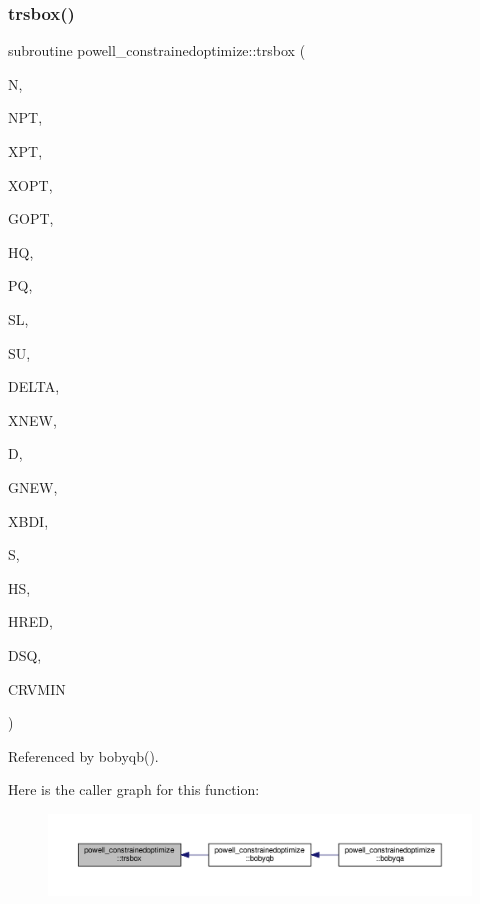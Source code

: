 \subsubsection{\texorpdfstring{trsbox()}{trsbox()}}
{\footnotesize\ttfamily subroutine powell\+\_\+constrainedoptimize\+::trsbox (\begin{DoxyParamCaption}\item[{}]{N,  }\item[{}]{N\+PT,  }\item[{dimension(npt,$\ast$)}]{X\+PT,  }\item[{dimension($\ast$)}]{X\+O\+PT,  }\item[{dimension($\ast$)}]{G\+O\+PT,  }\item[{dimension($\ast$)}]{HQ,  }\item[{dimension($\ast$)}]{PQ,  }\item[{dimension($\ast$)}]{SL,  }\item[{dimension($\ast$)}]{SU,  }\item[{}]{D\+E\+L\+TA,  }\item[{dimension($\ast$)}]{X\+N\+EW,  }\item[{dimension($\ast$)}]{D,  }\item[{dimension($\ast$)}]{G\+N\+EW,  }\item[{dimension($\ast$)}]{X\+B\+DI,  }\item[{dimension($\ast$)}]{S,  }\item[{dimension($\ast$)}]{HS,  }\item[{dimension($\ast$)}]{H\+R\+ED,  }\item[{}]{D\+SQ,  }\item[{}]{C\+R\+V\+M\+IN }\end{DoxyParamCaption})\hspace{0.3cm}{\ttfamily [private]}}



Referenced by bobyqb().

Here is the caller graph for this function\+:
\nopagebreak
\begin{figure}[H]
\begin{center}
\leavevmode
\includegraphics[width=350pt]{namespacepowell__constrainedoptimize_a8d96126f07f9d909b52d61690eaa4c80_icgraph}
\end{center}
\end{figure}
\mbox{\label{namespacepowell__constrainedoptimize_aea17c033c10b38991c1484dfd380b3b1}} 
